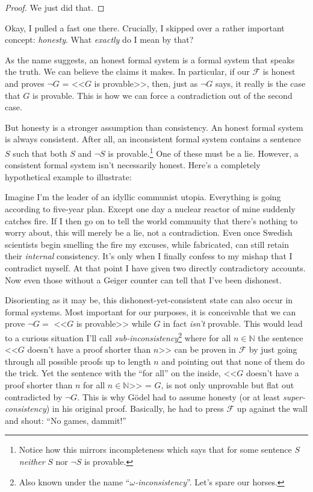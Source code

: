 \documentclass{article}
\theoremstyle{customstyle}
\newcommand{\F}{\ensuremath{\mathcal{F}}}
\begin{document}
\begin{proof}
We just did that.
\end{proof}

Okay, I pulled a fast one there. Crucially, I skipped over a rather important concept: \textit{honesty}. What \textit{exactly} do I mean by that?

As the name suggests, an honest formal system is a formal system that speaks the truth. We can believe the claims it makes. In particular, if our $\F$ is honest and proves $\neg G$ = <<$G$ is provable>>, then, just as $\neg G$ says, it really is the case that $G$ is provable. This is how we can force a contradiction out of the second case.

But honesty is a stronger assumption than consistency. An honest formal system is always consistent. After all, an inconsistent formal system contains a sentence $S$ such that both $S$ and $\neg S$ is provable.\footnote{Notice how this mirrors incompleteness which says that for some sentence $S$ \textit{neither} $S$ nor $\neg S$ is provable.} One of these must be a lie. However, a consistent formal system isn't necessarily honest. Here's a completely hypothetical example to illustrate: 

Imagine I'm the leader of an idyllic communist utopia. Everything is going according to five-year plan. Except one day a nuclear reactor of mine suddenly catches fire. If I then go on to tell the world community that there's nothing to worry about, this will merely be a lie, not a contradiction. Even once Swedish scientists begin smelling the fire my excuses, while fabricated, can still retain their \textit{internal} consistency. It's only when I finally confess to my mishap that I contradict myself. At that point I have given two directly contradictory accounts. Now even those without a Geiger counter can tell that I've been dishonest.

Disorienting as it may be, this dishonest-yet-consistent state can also occur in formal systems. Most important for our purposes, it is conceivable that we can prove $\neg G =$ <<$G$ is provable>> while $G$ in fact \textit{isn't} provable. This would lead to a curious situation I'll call \textit{sub-inconsistency}\footnote{Also known under the name ``\textit{$\omega$-inconsistency}''. Let's spare our horses.} where for all $n\in\mathbb{N}$ the sentence <<$G$ doesn't have a proof shorter than $n$>> can be proven in $\F$ by just going through all possible proofs up to length $n$ and pointing out that none of them do the trick. Yet the sentence with the ``for all'' on the inside, <<$G$ doesn't have a proof shorter than $n$ for all $n\in\mathbb{N}$>> = $G$, is not only unprovable but flat out contradicted by $\neg G$. This is why Gödel had to assume honesty (or at least \textit{super-consistency}) in his original proof. Basically, he had to press $\F$ up against the wall and shout: ``No games, dammit!''
\end{document}

